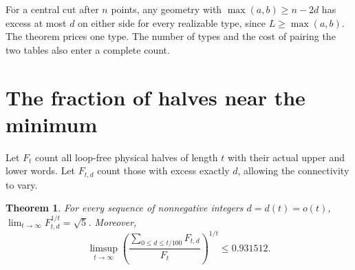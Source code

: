 \documentclass[11pt]{article}
\newtheorem{theorem}{Theorem}
\begin{document}
For a central cut after \(n\) points, any geometry with \(\max(a,b)\ge n-2d\) has excess at most \(d\) on either side for every realizable type, since \(L\ge\max(a,b)\). The theorem prices one type. The number of types and the cost of pairing the two tables also enter a complete count.

\newpage
\section{The fraction of halves near the minimum}
Let \(F_t\) count all loop-free physical halves of length \(t\) with their actual upper and lower words. Let \(F_{t,d}\) count those with excess exactly \(d\), allowing the connectivity to vary.

\begin{theorem}\label{growth}
For every sequence of nonnegative integers \(d=d(t)=o(t)\),
\(\lim_{t\to\infty} F_{t,d}^{1/t}=\sqrt5\). Moreover,
\[
 \limsup_{t\to\infty}
 \left(\frac{\sum_{0\le d\le t/100} F_{t,d}}{F_t}\right)^{1/t}
 \le 0.931512 .
\]
\end{theorem}
\end{document}
